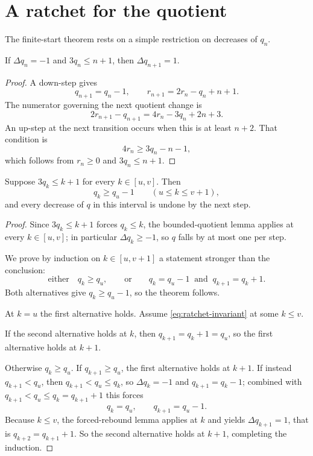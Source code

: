 \section{A ratchet for the quotient}

The finite-start theorem rests on a simple restriction on decreases of $q_n$.

\begin{lemma}
If $\Delta q_n=-1$ and $3q_n\le n+1$, then $\Delta q_{n+1}=1$.
\end{lemma}

\begin{proof}
A down-step gives
\[
 q_{n+1}=q_n-1,
 \qquad
 r_{n+1}=2r_n-q_n+n+1.
\]
The numerator governing the next quotient change is
\[
 2r_{n+1}-q_{n+1}=4r_n-3q_n+2n+3.
\]
An up-step at the next transition occurs when this is at least $n+2$. That condition is
\[
 4r_n\ge3q_n-n-1,
\]
which follows from $r_n\ge0$ and $3q_n\le n+1$.
\end{proof}

\begin{theorem}[Ratchet]
Suppose $3q_k\le k+1$ for every $k\in[u,v]$. Then
\[
 q_k\ge q_u-1\qquad(u\le k\le v+1),
\]
and every decrease of $q$ in this interval is undone by the next step.
\end{theorem}

\begin{proof}
Since $3q_k\le k+1$ forces $q_k\le k$, the bounded-quotient lemma applies at every $k\in[u,v]$; in particular $\Delta q_k\ge-1$, so $q$ falls by at most one per step.

We prove by induction on $k\in[u,v+1]$ a statement stronger than the conclusion:
\begin{equation}
 \text{either}\quad q_k\ge q_u,
 \qquad\text{or}\qquad
 q_k=q_u-1\ \text{ and }\ q_{k+1}=q_k+1.
 \label{eq:ratchet-invariant}
\end{equation}
Both alternatives give $q_k\ge q_u-1$, so the theorem follows.

At $k=u$ the first alternative holds. Assume \eqref{eq:ratchet-invariant} at some $k\le v$.

If the second alternative holds at $k$, then $q_{k+1}=q_k+1=q_u$, so the first alternative holds at $k+1$.

Otherwise $q_k\ge q_u$. If $q_{k+1}\ge q_u$, the first alternative holds at $k+1$. If instead $q_{k+1}<q_u$, then $q_{k+1}<q_u\le q_k$, so $\Delta q_k=-1$ and $q_{k+1}=q_k-1$; combined with $q_{k+1}<q_u\le q_k=q_{k+1}+1$ this forces
\[
 q_k=q_u,\qquad q_{k+1}=q_u-1.
\]
Because $k\le v$, the forced-rebound lemma applies at $k$ and yields $\Delta q_{k+1}=1$, that is $q_{k+2}=q_{k+1}+1$. So the second alternative holds at $k+1$, completing the induction.
\end{proof}

